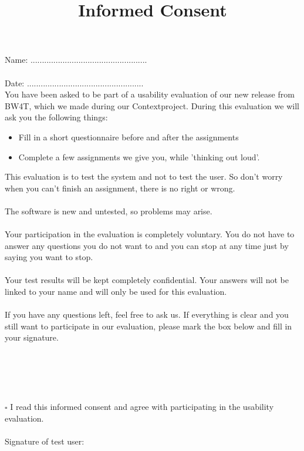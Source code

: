 \documentclass[a4paper]{article}
\title{Informed Consent}
\author{}
\date{}
\begin{document}
\maketitle
Name: ................................................... \\\\
Date: ................................................... \\

You have been asked to be part of a usability evaluation of our new release from BW4T, which we made during our Contextproject. During this evaluation we will ask you the following things:

\begin{itemize}
\item Fill in a short questionnaire before and after the assignments
\item Complete a few assignments we give you, while 'thinking out loud'.
\end{itemize}

This evaluation is to test the system and not to test the user. So don’t worry when you can’t finish an assignment, there is no right or wrong. \\
\\
The software is new and untested, so problems may arise. \\
\\
Your participation in the evaluation is completely voluntary. You do not have to answer any questions you do not want to and you can stop at any time just by saying you want to stop. \\
\\
Your test results will be kept completely confidential. Your answers will not be linked to your name and will only be used for this evaluation. \\
\\
If you have any questions left, feel free to ask us. If everything is clear and you still want to participate in our evaluation, please mark the box below and fill in your signature. \\
\\
\\
\\
\\
\\
$\square$ I read this informed consent and agree with participating in the usability evaluation. \\
\\
Signature of test user: \\
\end{document}

